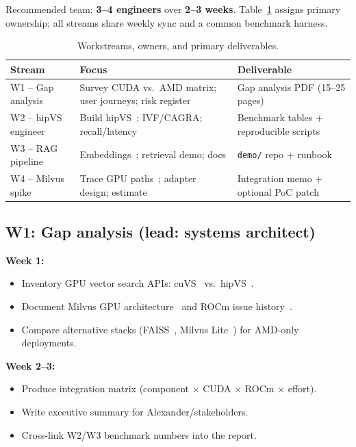 \documentclass[11pt,a4paper]{article}
\begin{document}
Recommended team: \textbf{3--4 engineers} over \textbf{2--3 weeks}.
Table~\ref{tab:workstreams} assigns primary ownership; all streams share weekly
sync and a common benchmark harness.

\begin{table}[htbp]
  \centering
  \caption{Workstreams, owners, and primary deliverables.}
  \label{tab:workstreams}
  \begin{tabularx}{\textwidth}{@{}l X X@{}}
    \toprule
    \textbf{Stream} & \textbf{Focus} & \textbf{Deliverable} \\
    \midrule
    W1 -- Gap analysis &
    Survey CUDA vs.\ AMD matrix; user journeys; risk register &
    Gap analysis PDF (15--25 pages) \\
    W2 -- hipVS engineer &
    Build hipVS~\cite{hipvs-build}; IVF/CAGRA; recall/latency &
    Benchmark tables + reproducible scripts \\
    W3 -- RAG pipeline &
    Embeddings~\cite{sentence-transformers}; retrieval demo; docs &
    \texttt{demo/} repo + runbook \\
    W4 -- Milvus spike &
    Trace GPU paths~\cite{milvus-gpu-index}; adapter design; estimate &
    Integration memo + optional PoC patch \\
    \bottomrule
  \end{tabularx}
\end{table}

\subsection{W1: Gap analysis (lead: systems architect)}

\textbf{Week 1:}
\begin{itemize}[leftmargin=*]
  \item Inventory GPU vector search APIs: cuVS~\cite{cuvs-docs} vs.\
        hipVS~\cite{hipvs-docs}.
  \item Document Milvus GPU architecture~\cite{milvus-gpu-cagra,milvus-osdi21} and
        ROCm issue history~\cite{milvus-rocm-issue}.
  \item Compare alternative stacks (FAISS~\cite{faiss-arxiv}, Milvus Lite~\cite{milvus-lite})
        for AMD-only deployments.
\end{itemize}

\textbf{Week 2--3:}
\begin{itemize}[leftmargin=*]
  \item Produce integration matrix (component $\times$ CUDA $\times$ ROCm $\times$ effort).
  \item Write executive summary for Alexander/stakeholders.
  \item Cross-link W2/W3 benchmark numbers into the report.
\end{itemize}
\end{document}
